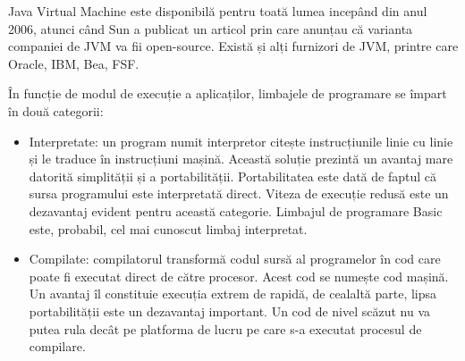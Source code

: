 \documentclass[12pt]{book}
\begin{document}
Java Virtual Machine este disponibilă pentru toată lumea incepând din anul 2006, atunci când Sun a publicat un articol prin care anunțau că varianta companiei de JVM va fii open-source. Există și alți furnizori de JVM, printre care Oracle, IBM, Bea, FSF. \cite{thinkJava}

În funcție de modul de execuție a aplicaților, limbajele de programare se împart în două categorii:
\begin{addmargin}[4em]{1em}
	\begin{itemize}
		\item Interpretate: un program numit interpretor citește instrucțiunile linie cu linie și le traduce în instrucțiuni mașină. Această soluție prezintă un avantaj mare datorită simplității și a portabilității. Portabilitatea este dată de faptul că sursa programului este interpretată direct. Viteza de execuție redusă este un dezavantaj evident pentru această categorie. Limbajul de programare Basic este, probabil, cel mai cunoscut limbaj interpretat. 
		\item Compilate: compilatorul transformă codul sursă al programelor în cod care poate fi executat direct de către procesor. Acest cod se numește cod mașină. Un avantaj îl constituie execuția extrem de rapidă, de cealaltă parte, lipsa portabilității este un dezavantaj important. Un cod de nivel scăzut nu va putea rula decât pe platforma de lucru pe care s-a executat procesul de compilare. 
	\end{itemize}
\end{addmargin}
\bigbreak
\end{document}
